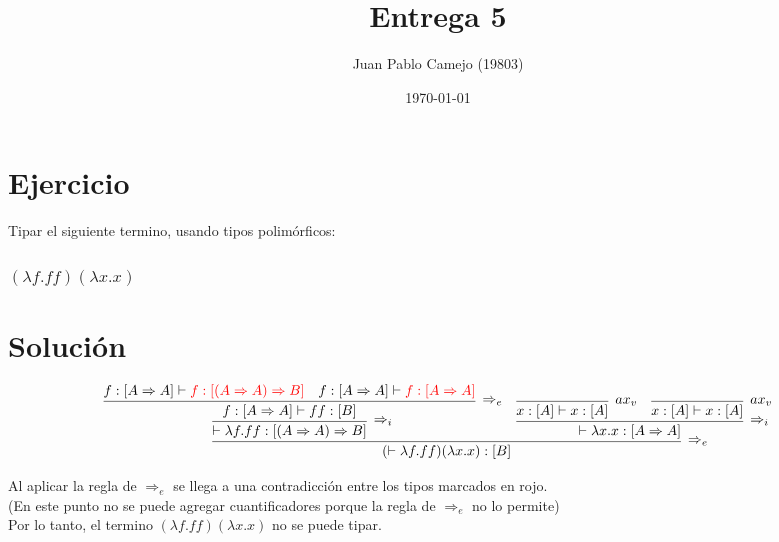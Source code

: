 \documentclass[a4paper,10pt]{article} %
\title{Entrega 5}
\author{Juan Pablo Camejo (19803)}
\date{\today}  %
\newcommand{\To}[0]{\Rightarrow}
\newcommand{\vd}[0]{\vdash}
\newcommand\fun[2]{\ensuremath{\lambda {#1}{.}{#2}}}
\begin{document}
\maketitle   %

\section*{Ejercicio}
Tipar el siguiente termino, usando tipos polimórficos: 
\subsubsection*{ $(\fun f{ff})(\fun xx)$}


\section*{Solución}

$$
\infer[\To_e]{(\vd \fun f{ff})(\fun xx) :[B]}{
      \infer[\To_i]{ \vd\fun f{ff} :[(A \To A) \To B] }{
          \infer[\To_e]{f:[A \To A] \vd ff : [B]}{
               f:[A \To A] \vd \color{red}f:[(A \To A)\To B]
             & f:[A \To A] \vd \color{red}f:[A \To A]
          }
      } 
    & \infer[\To_i]{\vd \fun xx : [A \To A]}{ 
          \infer[ax_v]{x:[A]\vd x:[A]}{} 
        & \infer[ax_v]{x:[A]\vd x:[A]}{}
    }
}
$$

Al aplicar la regla de $\To_e$ se llega a una contradicción entre los tipos marcados en rojo.\\
(En este punto no se puede agregar cuantificadores porque la regla de $\To_e$ no lo permite)\\
Por lo tanto, el termino $(\fun f{ff})(\fun xx)$ no se puede tipar.
\end{document}
